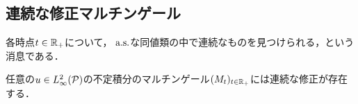 \documentclass[uplatex,dvipdfmx]{jsreport}
\begin{document}
\subsection{連続な修正マルチンゲール}

\begin{tcolorbox}[colframe=ForestGreen, colback=ForestGreen!10!white,breakable,colbacktitle=ForestGreen!40!white,coltitle=black,fonttitle=\bfseries\sffamily,
title=]
    各時点$t\in\R_+$について，$\as$な同値類の中で連続なものを見つけられる，という消息である．
\end{tcolorbox}

\begin{proposition}[$C$-過程と法則同等]
    任意の$u\in L^2_\infty(\P)$の不定積分のマルチンゲール$(M_t)_{t\in\R_+}$には連続な修正が存在する．
\end{proposition}
\end{document}
